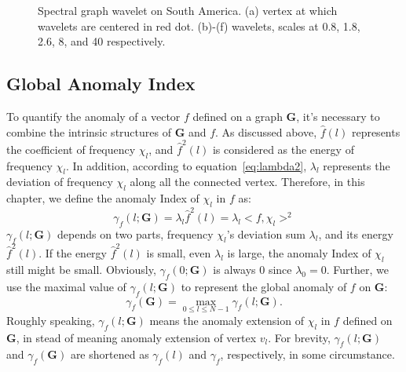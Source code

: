 \begin{figure}[t]
{		\label{fig:brazil5}
	}
	\caption{Spectral graph wavelet on South America. (a) vertex at which wavelets are centered in red dot. (b)-(f) wavelets, scales at 0.8, 1.8, 2.6, 8, and 40 respectively.}
	\label{fig:example2}
\end{figure}

\subsection{Global Anomaly Index}
\label{sec:signal_anomaly_on_Graph}

To quantify the anomaly of a vector $f$ defined on a graph $\mathbf{G}$, it's necessary to combine the intrinsic structures of $\mathbf{G}$ and $f$. As discussed above, $\hat{f}(l)$ represents the coefficient of frequency $\chi_l$, and $\hat{f}^2(l)$ is considered as the energy of frequency $\chi_l$. In addition, according to equation~\ref{eq:lambda2}, $\lambda_l$ represents the deviation of frequency $\chi_l$ along all the connected vertex. Therefore, in this chapter, we define the anomaly Index of $\chi_l$ in $f$ as:
\begin{equation}
\label{eq:lambda3}
\gamma_f(l;\mathbf{G})=\lambda_l\hat{f}^2(l)= \lambda_l<f,\chi_l>^2
\end{equation}
$\gamma_f(l;\mathbf{G})$ depends on two parts, frequency $\chi_l$'s deviation sum $\lambda_l$, and its energy $\hat{f}^2(l)$. If the energy $\hat{f}^2(l)$ is small, even $\lambda_l$ is large, the anomaly Index of $\chi_l$ still might be small. Obviously, $\gamma_f(0;\mathbf{G})$ is always $0$ since $\lambda_0=0$. Further, we use the maximal value of $\gamma_f(l;\mathbf{G})$ to represent the global anomaly of $f$ on $\mathbf{G}$:
\begin{equation}
\label{eq:lambda4}
\gamma_f(\mathbf{G})=\underset{0 \leq l \leq N-1}{\max}{\gamma_f(l;\mathbf{G})}.
\end{equation}
Roughly speaking, $\gamma_f(l;\mathbf{G})$ means the anomaly extension of $\chi_l$ in $f$ defined on $\mathbf{G}$, in stead of meaning anomaly extension of vertex $v_l$.
For brevity, $\gamma_f(l;\mathbf{G})$  and $\gamma_f(\mathbf{G})$ are shortened as $\gamma_f(l)$ and $\gamma_f$, respectively, in some circumstance.

